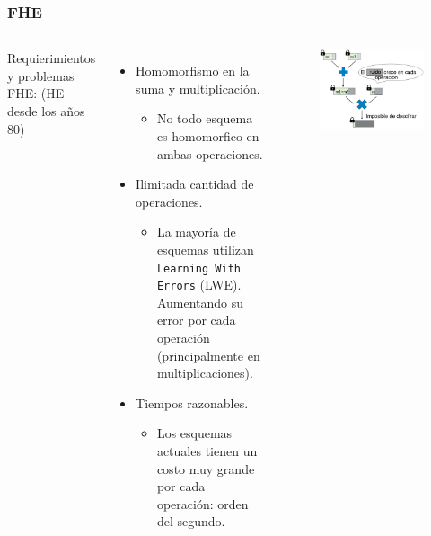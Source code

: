 \documentclass[10pt]{beamer}
\begin{document}







\begin{frame}
\frametitle{FHE}
\vspace{0.3cm}
\begin{columns}
    Requierimientos y problemas FHE: (HE desde los años 80)
\pause
\begin{itemize}
  \item[\textcolor{frenchblue}{\textbullet}] Homomorfismo en la suma y multiplicación.
    \begin{itemize}
\pause
      \item[\textcolor{red}{\textbullet}]  No todo esquema es homomorfico en ambas operaciones.
    \end{itemize}
\pause
  \item[\textcolor{frenchblue}{\textbullet}] Ilimitada cantidad de operaciones.
    \begin{itemize}
\pause
      \item[\textcolor{red}{\textbullet}]  La mayoría de esquemas utilizan \texttt{Learning With Errors} (LWE). Aumentando su error por cada operación (principalmente en multiplicaciones).
    \end{itemize}
\pause
  \item[\textcolor{frenchblue}{\textbullet}] Tiempos razonables.
    \begin{itemize}
\pause
      \item[\textcolor{red}{\textbullet}]  Los esquemas actuales tienen un costo muy grande por cada operación: orden del segundo.
    \end{itemize}
\end{itemize}
\pause
        \begin{figure}[h!]
            \centering
            \includegraphics[scale=0.2]{multNoise.jpg}
        \end{figure}


\end{columns}
\end{frame}
\end{document}
